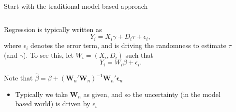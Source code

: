\documentclass[notes,11pt, aspectratio=169]{beamer}
\newenvironment{wideitemize}{\itemize\addtolength{\itemsep}{10pt}}{\enditemize}
\begin{document}
\begin{frame}{Start with the traditional model-based approach}
\begin{columns}[T] %
\begin{column}{.8\textwidth}
  \begin{wideitemize}
  \item Regression is typically written as
    \begin{equation*}
      Y_{i} = X_{i}\gamma + D_{i}\tau + \epsilon_{i},
    \end{equation*}
    where $\epsilon_{i}$ denotes the error term, and is driving the
    randomness to estimate $\tau$ (and $\gamma$). To see this, let
    $W_{i} = (X_{i}, D_{i})$ such that
    \begin{equation*}
      Y_{i} = W_{i}\beta + \epsilon_{i}.
    \end{equation*}
  \item Note that $\hat{\beta} = \beta + (\mathbf{W}_{n}'\mathbf{W}_{n})^{-1}\mathbf{W}_{n}'\boldsymbol{\epsilon}_{n}$
    \begin{itemize}
    \item Typically we take $\mathbf{W}_{n}$ as given, and so the
      uncertainty (in the model based world) is driven by $\epsilon_{i}$
    \end{itemize}
  \end{wideitemize}
  \end{column}%
  \hfill%
  \begin{column}{.5\textwidth}
  \end{column}
\end{columns}
  
\end{frame}
\end{document}
